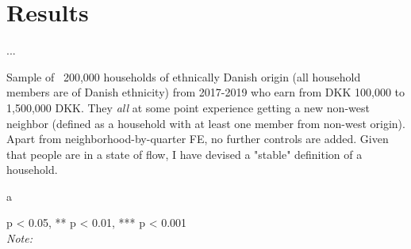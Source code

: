 \documentclass[../main.tex]{subfiles}
\begin{document}
\section{Results}
\label{sec:results}

...

Sample of ~200,000 households of ethnically Danish origin (all household members are of Danish ethnicity) from 2017-2019 who earn from DKK 100,000 to 1,500,000 DKK. They \textit{all} at some point experience getting a new non-west neighbor (defined as a household with at least one member from non-west origin). Apart from neighborhood-by-quarter FE, no further controls are added. Given that people are in a state of flow, I have devised a "stable" definition of a household.

\begin{table}[H]
\centering
    \caption{a}
        
    \label{tab:descriptives_native_and_non_west}
\begin{tablenotes}[flushleft]
\item \scriptsize * p < 0.05, ** p < 0.01, *** p < 0.001 \\ \textit{Note:}
\end{tablenotes}
\end{table}
\end{document}
